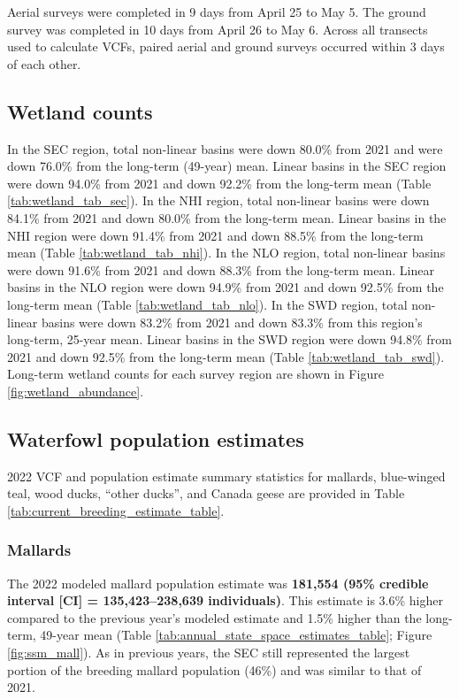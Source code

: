 \documentclass[
  12pt,
]{article}
\begin{document}
Aerial surveys were completed in 9 days from April 25 to May 5. The
ground survey was completed in 10 days from April 26 to May 6. Across
all transects used to calculate VCFs, paired aerial and ground surveys
occurred within 3 days of each other.

\hypertarget{wetland-counts}{%
\subsection{Wetland counts}\label{wetland-counts}}

In the SEC region, total non-linear basins were down 80.0\% from 2021
and were down 76.0\% from the long-term (49-year) mean. Linear basins in
the SEC region were down 94.0\% from 2021 and down 92.2\% from the
long-term mean (Table \ref{tab:wetland_tab_sec}). In the NHI region,
total non-linear basins were down 84.1\% from 2021 and down 80.0\% from
the long-term mean. Linear basins in the NHI region were down 91.4\%
from 2021 and down 88.5\% from the long-term mean (Table
\ref{tab:wetland_tab_nhi}). In the NLO region, total non-linear basins
were down 91.6\% from 2021 and down 88.3\% from the long-term mean.
Linear basins in the NLO region were down 94.9\% from 2021 and down
92.5\% from the long-term mean (Table \ref{tab:wetland_tab_nlo}). In the
SWD region, total non-linear basins were down 83.2\% from 2021 and down
83.3\% from this region's long-term, 25-year mean. Linear basins in the
SWD region were down 94.8\% from 2021 and down 92.5\% from the long-term
mean (Table \ref{tab:wetland_tab_swd}). Long-term wetland counts for
each survey region are shown in Figure \ref{fig:wetland_abundance}.

\hypertarget{waterfowl-population-estimates}{%
\subsection{Waterfowl population
estimates}\label{waterfowl-population-estimates}}

2022 VCF and population estimate summary statistics for mallards,
blue-winged teal, wood ducks, ``other ducks'', and Canada geese are
provided in Table \ref{tab:current_breeding_estimate_table}.

\hypertarget{mallards}{%
\subsubsection{Mallards}\label{mallards}}

The 2022 modeled mallard population estimate was \textbf{181,554 (95\%
credible interval {[}CI{]} = 135,423--238,639 individuals)}. This
estimate is 3.6\% higher compared to the previous year's modeled
estimate and 1.5\% higher than the long-term, 49-year mean (Table
\ref{tab:annual_state_space_estimates_table}; Figure
\ref{fig:ssm_mall}). As in previous years, the SEC still represented the
largest portion of the breeding mallard population (46\%) and was
similar to that of 2021.
\end{document}
